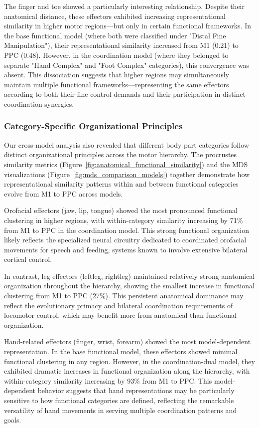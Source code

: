 \documentclass{article}
\begin{document}
The finger and toe showed a particularly interesting relationship. Despite their anatomical distance, these effectors exhibited increasing representational similarity in higher motor regions—but only in certain functional frameworks. In the base functional model (where both were classified under "Distal Fine Manipulation"), their representational similarity increased from M1 (0.21) to PPC (0.48). However, in the coordination model (where they belonged to separate "Hand Complex" and "Foot Complex" categories), this convergence was absent. This dissociation suggests that higher regions may simultaneously maintain multiple functional frameworks—representing the same effectors according to both their fine control demands and their participation in distinct coordination synergies.

\subsubsection{Category-Specific Organizational Principles}

Our cross-model analysis also revealed that different body part categories follow distinct organizational principles across the motor hierarchy. The procrustes similarity metrics (Figure~\ref{fig:anatomical_functional_similarity}) and the MDS visualizations (Figure~\ref{fig:mds_comparison_models}) together demonstrate how representational similarity patterns within and between functional categories evolve from M1 to PPC across models.

Orofacial effectors (jaw, lip, tongue) showed the most pronounced functional clustering in higher regions, with within-category similarity increasing by 71\% from M1 to PPC in the coordination model. This strong functional organization likely reflects the specialized neural circuitry dedicated to coordinated orofacial movements for speech and feeding, systems known to involve extensive bilateral cortical control.

In contrast, leg effectors (leftleg, rightleg) maintained relatively strong anatomical organization throughout the hierarchy, showing the smallest increase in functional clustering from M1 to PPC (27\%). This persistent anatomical dominance may reflect the evolutionary primacy and bilateral coordination requirements of locomotor control, which may benefit more from anatomical than functional organization.

Hand-related effectors (finger, wrist, forearm) showed the most model-dependent representation. In the base functional model, these effectors showed minimal functional clustering in any region. However, in the coordination-dual model, they exhibited dramatic increases in functional organization along the hierarchy, with within-category similarity increasing by 93\% from M1 to PPC. This model-dependent behavior suggests that hand representations may be particularly sensitive to how functional categories are defined, reflecting the remarkable versatility of hand movements in serving multiple coordination patterns and goals.
\end{document}

